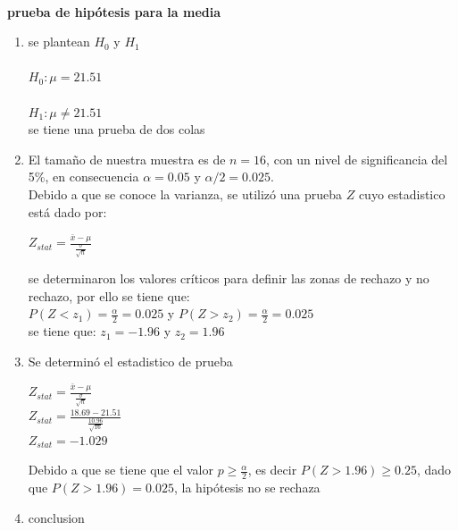 \documentclass{article}
\begin{document}
\begin{enumerate}
    \paragraph*{}\textbf{prueba de hipótesis para la media}\\
    \begin{enumerate}
        \item se plantean $H_0$ y $H_1$
        \paragraph{} $H_0: \mu = 21.51$
        \paragraph{} $H_1: \mu \neq 21.51 $\\
        se tiene una prueba de dos colas 
        \item El tamaño de nuestra muestra es de $n=16$, con un nivel de significancia del 5\%, en consecuencia $\alpha = 0.05$ y $\alpha/2 =0.025$.\\
        Debido a que se conoce la varianza, se utilizó una prueba $Z$ cuyo estadistico está dado por:\\
        \begin{center}
            $Z_{stat} = \frac{\bar{x}-\mu}{\frac{\sigma}{\sqrt{n}}}$\\
        \end{center}
        se determinaron los valores críticos para definir las zonas de rechazo y no rechazo, por ello se tiene que: \\
        $P(Z<z_1)=\frac{\alpha}{2}=0.025$ y $P(Z>z_2)=\frac{\alpha}{2}=0.025$\\
        se tiene que: $z_1= -1.96$ y $z_2= 1.96$
        \item Se determinó el estadistico de prueba \\
        \begin{center}
            $Z_{stat} = \frac{\bar{x}-\mu}{\frac{\sigma}{\sqrt{n}}}$\\ 
            $Z_{stat}=\frac{18.69-21.51}{\frac{10.96}{\sqrt{16}}}$\\             
            $Z_{stat}=-1.029$
        \end{center}
        Debido a que se tiene que el valor $p\geq \frac{\alpha}{2}$, es decir $P(Z>1.96)\geq 0.25$, dado que $P(Z>1.96)=0.025$, la hipótesis no se rechaza 
        \item conclusion
    \end{enumerate}

\end{enumerate}
\end{document}
